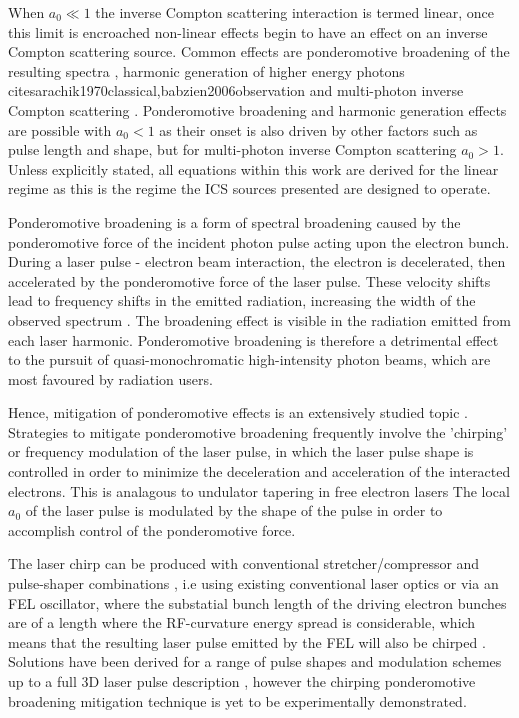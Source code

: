 \documentclass[../main.tex]{subfiles}
\begin{document}
When $a_{0} \ll 1$ the inverse Compton scattering interaction is termed linear, once this limit is encroached non-linear effects begin to have an effect on an inverse Compton scattering source. Common effects are ponderomotive broadening of the resulting spectra \cite{krafft2004spectral}, harmonic generation of higher energy photons cite{sarachik1970classical,babzien2006observation} and multi-photon inverse Compton scattering \cite{bula1996observation}. Ponderomotive broadening and harmonic generation effects are possible with $a_{0}<1$ as their onset is also driven by other factors such as pulse length and shape, but for multi-photon inverse Compton scattering $a_{0}>1$. Unless explicitly stated, all equations within this work are derived for the linear regime as this is the regime the ICS sources presented are designed to operate.

Ponderomotive broadening is a form of spectral broadening caused by the ponderomotive force of the incident photon pulse acting upon the electron bunch. During a laser pulse - electron beam interaction, the electron is decelerated, then accelerated by the ponderomotive force of the laser
pulse. These velocity shifts lead to frequency shifts in the
emitted radiation, increasing the width of the observed
spectrum \cite{krafft2004spectral}. The broadening effect is visible in the radiation emitted from each laser harmonic. Ponderomotive broadening is therefore a detrimental effect to the pursuit of quasi-monochromatic high-intensity photon beams, which are most favoured by radiation users. 

Hence, mitigation of ponderomotive effects is an extensively studied topic \cite{ghebregziabher2013spectral,terzic2014narrow,seipt2015narrowband,rykovanov2016controlling,terzic2016combining,terzic2019improving}. Strategies to mitigate ponderomotive broadening frequently involve the 'chirping' or frequency modulation of the laser pulse, in which the laser pulse shape is controlled in order to minimize the deceleration and acceleration of the interacted electrons. This is analagous to undulator tapering in free electron lasers The local $a_{0}$ of the laser pulse is modulated by the shape of the pulse in order to accomplish control of the ponderomotive force. 

The laser chirp can be produced with conventional stretcher/compressor and pulse-shaper combinations \cite{ghebregziabher2013spectral}, i.e using existing conventional laser optics or via an FEL oscillator, where the substatial bunch length of the driving electron bunches are of a length where the RF-curvature energy spread is considerable, which means that the resulting laser pulse emitted by the FEL will
also be chirped \cite{terzic2014narrow}. Solutions have been derived for a range of pulse shapes and modulation schemes up to a full 3D laser pulse description \cite{terzic2019improving}, however the chirping ponderomotive broadening mitigation technique is yet to be experimentally demonstrated.
\end{document}
